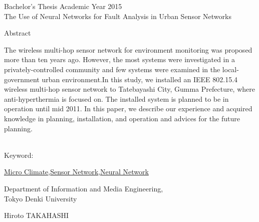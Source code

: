 \begin{center}
\LARGE{Bachelor's Thesis Academic Year 2015}\\

\vspace{10mm}
\LARGE{The Use of Neural Networks for Fault Analysis in Urban Sensor Networks}\\
\end{center}
\begin{center}
Abstract\\
\end{center}
The wireless multi-hop sensor network for environment monitoring was proposed more than ten years ago. However, the most systems were investigated in a privately-controlled community and few systems were examined in the local-government urban environment.In this study, we installed an IEEE 802.15.4 wireless multi-hop sensor network to Tatebayashi City, Gumma Prefecture, where anti-hyperthermia is focused on. The installed system is planned to be in operation until mid 2011. In this paper, we describe our experience and acquired knowledge in planning, installation, and operation and advices for the future planning.
\\\\

\begin{flushleft}Keyword:\\
\end{flushleft}
{\underline{Micro Climate},\underline{Sensor Network},\underline{Neural Network}}

\begin{flushright}
\vspace{10mm}

\vspace{5mm}
\large Department of Information and Media Engineering,\\
Tokyo Denki University\\
\begin{flushright}\LARGE Hiroto TAKAHASHI\\
\end{flushright}

\end{flushright}
